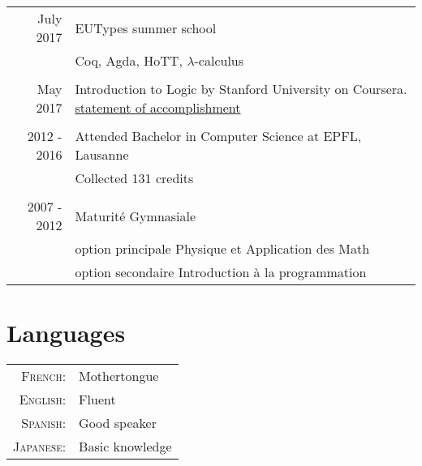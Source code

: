 \documentclass[a4paper,10pt]{article} %
\begin{document}
\begin{tabular}{rl}	

July 2017 & EUTypes summer school \\&\footnotesize{Coq, Agda, HoTT, $\lambda$-calculus} \\
\multicolumn{2}{c}{}\\
May 2017 & Introduction to Logic by Stanford University on Coursera. \footnotesize{\href{https://www.coursera.org/account/accomplishments/certificate/RPGEPLA94HFF}{statement of accomplishment}}\\
\multicolumn{2}{c}{}\\
2012 - 2016 & Attended Bachelor in Computer Science at EPFL, Lausanne\\
& \footnotesize{Collected 131 credits}\\
\multicolumn{2}{c}{}\\


2007 - 2012 & Maturité Gymnasiale\\ & option principale Physique et Application des Math\\ & option secondaire Introduction à la programmation\\
\end{tabular}

\renewcommand{\arraystretch}{1.2}


\section{Languages}

\begin{tabular}{rl}
\textsc{French:} & Mothertongue\\

\textsc{English:} & Fluent\\

\textsc{Spanish:} & Good speaker\\

\textsc{Japanese:} & Basic knowledge\\

\end{tabular}

\end{document}

